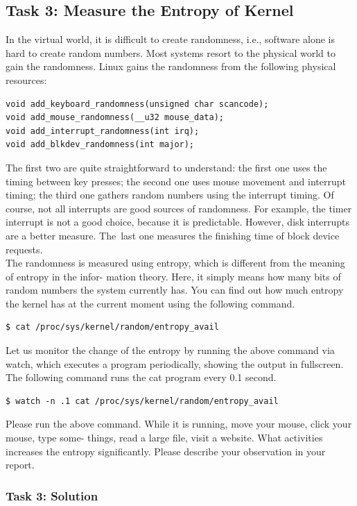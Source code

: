 \documentclass[12pt]{article}
\newcommand\tab[1][0.5cm]{\hspace*{#1}}
\begin{document}
\subsection{Task 3: Measure the Entropy of Kernel}
In the virtual world, it is difficult to create randomness, i.e., software alone is hard to create random numbers.
Most systems resort to the physical world to gain the randomness. Linux gains the randomness from the
following physical resources:
\begin{verbatim}
void add_keyboard_randomness(unsigned char scancode);
void add_mouse_randomness(__u32 mouse_data);
void add_interrupt_randomness(int irq);
void add_blkdev_randomness(int major);
\end{verbatim}
\tab The first two are quite straightforward to understand: the first one uses the timing between key presses;
the second one uses mouse movement and interrupt timing; the third one gathers random numbers using
the interrupt timing. Of course, not all interrupts are good sources of randomness. For example, the timer
interrupt is not a good choice, because it is predictable. However, disk interrupts are a better measure. The\
last one measures the finishing time of block device requests. \\
\tab The randomness is measured using entropy, which is different from the meaning of entropy in the infor-
mation theory. Here, it simply means how many bits of random numbers the system currently has. You can
find out how much entropy the kernel has at the current moment using the following command.
\begin{verbatim}
$ cat /proc/sys/kernel/random/entropy_avail
\end{verbatim}
\tab Let us monitor the change of the entropy by running the above command via watch, which executes
a program periodically, showing the output in fullscreen. The following command runs the cat program
every 0.1 second.
\begin{verbatim}
$ watch -n .1 cat /proc/sys/kernel/random/entropy_avail
\end{verbatim}
Please run the above command. While it is running, move your mouse, click your mouse, type some-
things, read a large file, visit a website. What activities increases the entropy significantly. Please describe
your observation in your report.

\subsubsection{Task 3: Solution}
\end{document}
